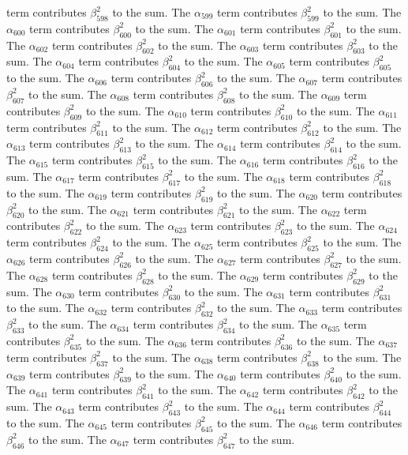 \begin{lemma}
term contributes $\beta_{598}^{2}$ to the sum. The $\alpha_{599}$ term contributes $\beta_{599}^{2}$ to the sum. The $\alpha_{600}$ term contributes $\beta_{600}^{2}$ to the sum. The $\alpha_{601}$ term contributes $\beta_{601}^{2}$ to the sum. The $\alpha_{602}$ term contributes $\beta_{602}^{2}$ to the sum. The $\alpha_{603}$ term contributes $\beta_{603}^{2}$ to the sum. The $\alpha_{604}$ term contributes $\beta_{604}^{2}$ to the sum. The $\alpha_{605}$ term contributes $\beta_{605}^{2}$ to the sum. The $\alpha_{606}$ term contributes $\beta_{606}^{2}$ to the sum. The $\alpha_{607}$ term contributes $\beta_{607}^{2}$ to the sum. The $\alpha_{608}$ term contributes $\beta_{608}^{2}$ to the sum. The $\alpha_{609}$ term contributes $\beta_{609}^{2}$ to the sum. The $\alpha_{610}$ term contributes $\beta_{610}^{2}$ to the sum. The $\alpha_{611}$ term contributes $\beta_{611}^{2}$ to the sum. The $\alpha_{612}$ term contributes $\beta_{612}^{2}$ to the sum. The $\alpha_{613}$ term contributes $\beta_{613}^{2}$ to the sum. The $\alpha_{614}$ term contributes $\beta_{614}^{2}$ to the sum. The $\alpha_{615}$ term contributes $\beta_{615}^{2}$ to the sum. The $\alpha_{616}$ term contributes $\beta_{616}^{2}$ to the sum. The $\alpha_{617}$ term contributes $\beta_{617}^{2}$ to the sum. The $\alpha_{618}$ term contributes $\beta_{618}^{2}$ to the sum. The $\alpha_{619}$ term contributes $\beta_{619}^{2}$ to the sum. The $\alpha_{620}$ term contributes $\beta_{620}^{2}$ to the sum. The $\alpha_{621}$ term contributes $\beta_{621}^{2}$ to the sum. The $\alpha_{622}$ term contributes $\beta_{622}^{2}$ to the sum. The $\alpha_{623}$ term contributes $\beta_{623}^{2}$ to the sum. The $\alpha_{624}$ term contributes $\beta_{624}^{2}$ to the sum. The $\alpha_{625}$ term contributes $\beta_{625}^{2}$ to the sum. The $\alpha_{626}$ term contributes $\beta_{626}^{2}$ to the sum. The $\alpha_{627}$ term contributes $\beta_{627}^{2}$ to the sum. The $\alpha_{628}$ term contributes $\beta_{628}^{2}$ to the sum. The $\alpha_{629}$ term contributes $\beta_{629}^{2}$ to the sum. The $\alpha_{630}$ term contributes $\beta_{630}^{2}$ to the sum. The $\alpha_{631}$ term contributes $\beta_{631}^{2}$ to the sum. The $\alpha_{632}$ term contributes $\beta_{632}^{2}$ to the sum. The $\alpha_{633}$ term contributes $\beta_{633}^{2}$ to the sum. The $\alpha_{634}$ term contributes $\beta_{634}^{2}$ to the sum. The $\alpha_{635}$ term contributes $\beta_{635}^{2}$ to the sum. The $\alpha_{636}$ term contributes $\beta_{636}^{2}$ to the sum. The $\alpha_{637}$ term contributes $\beta_{637}^{2}$ to the sum. The $\alpha_{638}$ term contributes $\beta_{638}^{2}$ to the sum. The $\alpha_{639}$ term contributes $\beta_{639}^{2}$ to the sum. The $\alpha_{640}$ term contributes $\beta_{640}^{2}$ to the sum. The $\alpha_{641}$ term contributes $\beta_{641}^{2}$ to the sum. The $\alpha_{642}$ term contributes $\beta_{642}^{2}$ to the sum. The $\alpha_{643}$ term contributes $\beta_{643}^{2}$ to the sum. The $\alpha_{644}$ term contributes $\beta_{644}^{2}$ to the sum. The $\alpha_{645}$ term contributes $\beta_{645}^{2}$ to the sum. The $\alpha_{646}$ term contributes $\beta_{646}^{2}$ to the sum. The $\alpha_{647}$ term contributes $\beta_{647}^{2}$ to the sum. 
\end{lemma}
